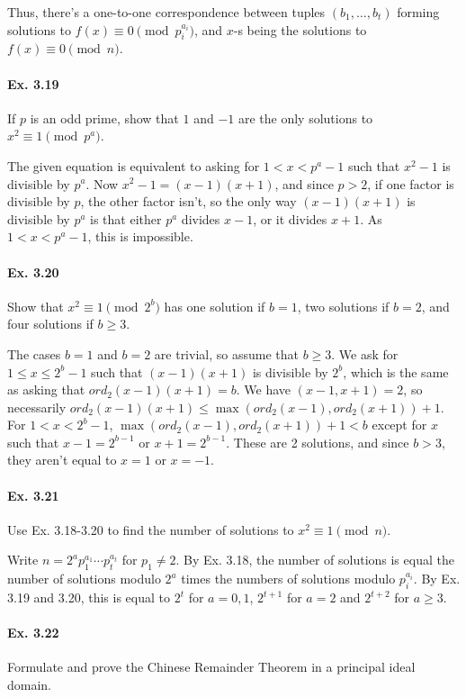 \documentclass[notitlepage]{article}
\theoremstyle{definition}
\begin{document}
Thus, there's a one-to-one correspondence between tuples $(b_1,
\ldots, b_t)$ forming solutions to $f(x) \equiv 0 \pmod {p_i^{a_i}}$,
and $x$-s being the solutions to $f(x) \equiv 0 \pmod {n}$.

\paragraph{Ex. 3.19}
If $p$ is an odd prime, show that $1$ and $-1$ are the only solutions
to $x^2 \equiv 1 \pmod {p^a}$.

The given equation is equivalent to asking for $1 < x < p^a-1$ such
that $x^2 - 1$ is divisible by ${p^a}$. Now $x^2 - 1 = (x-1)(x+1)$,
and since $p > 2$, if one factor is divisible by $p$, the other factor
isn't, so the only way $(x-1)(x+1)$ is divisible by $p^a$ is that
either $p^a$ divides $x-1$, or it divides $x+1$. As $1 < x < p^a-1$,
this is impossible.

\paragraph{Ex. 3.20}
Show that $x^2 \equiv 1 \pmod {2^b}$ has one solution if $b = 1$, two
solutions if $b = 2$, and four solutions if $b \geq 3$.

The cases $b=1$ and $b=2$ are trivial, so assume that $b \geq 3$. We
ask for $1 \leq x \leq 2^b - 1$ such that $(x-1)(x+1)$ is divisible by
$2^b$, which is the same as asking that $ord_2(x-1)(x+1) = b$. We have
$(x-1, x+1) = 2$, so necessarily $ord_2(x-1)(x+1) \leq
\max(ord_2(x-1), ord_2(x+1)) + 1$.  For $1 < x < 2^b - 1$,
$\max(ord_2(x-1), ord_2(x+1)) + 1 < b$ except for $x$ such that $x-1 =
2^{b-1}$ or $x+1 = 2^{b-1}$. These are 2 solutions, and since $b > 3$,
they aren't equal to $x = 1$ or $x = -1$.

\paragraph{Ex. 3.21}
Use Ex. 3.18-3.20 to find the number of solutions to $x^2 \equiv 1 \pmod n$.

Write $n = 2^a p_1^{a_1} \cdots p_t^{a_t}$ for $p_1 \ne 2$. By
Ex. 3.18, the number of solutions is equal the number of solutions
modulo $2^a$ times the numbers of solutions modulo $p_i^{a_i}$. By
Ex. 3.19 and 3.20, this is equal to $2^t$ for $a = 0, 1$, $2^{t+1}$
for $a = 2$ and $2^{t+2}$ for $a \geq 3$.

\paragraph{Ex. 3.22}
Formulate and prove the Chinese Remainder Theorem in a principal ideal
domain.
\end{document}
